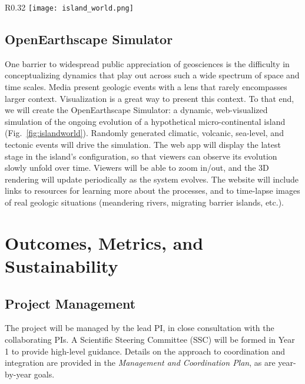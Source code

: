 \begin{wrapfigure}{R}{0.32\textwidth}
  \texttt{[image: island\_world.png]}
  \caption{Prototype OpenEarthscape Simulator, viewed from above, showing hypothetical ocean microcontinent undergoing active rifting.}%
  \label{fig:islandworld}
\end{wrapfigure}

\subsection{OpenEarthscape Simulator}
\label{sec:oes}

One barrier to widespread public appreciation of geosciences is the difficulty in conceptualizing dynamics that play out across such a wide spectrum of space and time scales. Media present geologic events with a lens that rarely encompasses larger context.
Visualization is a great way to present this context. To that end, we will create the OpenEarthscape Simulator: a dynamic, web-visualized simulation of the ongoing evolution of a hypothetical micro-continental island (Fig.~\ref{fig:islandworld}). Randomly generated climatic, volcanic, sea-level, and tectonic events will drive the simulation. The web app will display the latest stage in the island's configuration, so that viewers can observe its evolution slowly unfold over time. Viewers will be able to zoom in/out, and the 3D rendering will update periodically as the system evolves. The website will include links to resources for learning more about the processes, and to time-lapse images of real geologic situations (meandering rivers, migrating barrier islands, etc.). %

\section{Outcomes, Metrics, and Sustainability}

\subsection{Project Management}

The project will be managed by the lead PI, in close consultation with the collaborating PIs. A Scientific Steering Committee (SSC) will be formed in Year 1 to provide high-level guidance. Details on the approach to coordination and integration are provided in the \textit{Management and Coordination Plan}, as are year-by-year goals.

